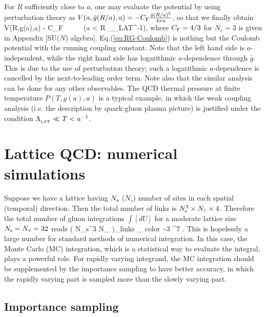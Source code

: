 For $R$ sufficiently close to $a$, one may evaluate the potential by using perturbation theory as
$V (a, \bar{g}(R/a), a)  = - C_{{\rm F}} \frac{\bar{g}(R/a)^2}{4\pi a}$, so that we finally obtain
\beq
\label{eq:RG-Coulomb}
V(R,g(a),a) \simeq - C_{{\rm F}}  \ \ \ \ \ (a < R \ll  \Lambda_{_{\rm LAT}}^{-1}),
\eeq
where $C_{{\rm F}}=4/3$ for $N_c=3$ is given in Appendix [SU($N$) algebra].
Eq.(\ref{eq:RG-Coulomb}) is nothing but the Coulomb potential with the running coupling constant.
Note that the left hand side is $a$-independent, while the right hand side has
logarithmic $a$-dependence through $\bar{g}$.  This is due to the use of perturbation theory;
such a logarithmic $a$-dependence  is cancelled by the next-to-leading order term.
Note also that the similar analysis can be done for any other observables.
The QCD thermal pressure at finite temperature $P(T,g(a),a)$ is a typical example, in which 
the weak coupling analysis (i.e. the description by  quark-gluon plasma picture)
is justified  under the condition  $  \Lambda_{_{\rm LAT}} \ll T < a^{-1}$. 



\section{Lattice QCD:  numerical simulations}


Suppose we have a lattice having $N_{\rm s}$ ($N_{\tau}$) number of sites
in each spatial (temporal) direction. Then 
 the total number of links is 
   $  N_{\rm s}^3 \times N_{\tau}  \times 4$. 
 Therefore the total  number of gluon integrations $\int [dU]$
 for a moderate lattice size  $N_{\rm s} = N_{\tau} =32$ reads
\beq
\label{eq:5.lattice-size}
 ( N_{\rm s}^3 \times N_{\tau}  )_{\rm links} _{\rm
 color} \sim 3 ^7 .  
\eeq 
This is hopelessly a large number for standard methods of numerical
integration.  In this case, the Monte Carlo (MC) integration, which is
a statistical way to evaluate the integral, plays a powerful role. For
rapidly varying integrand, the MC integration should be supplemented
by the importance sampling to have better accuracy, in which the
rapidly varying part is sampled more than the slowly varying part.
     
     
\subsection{Importance sampling}
\label{ss:IS}
    
